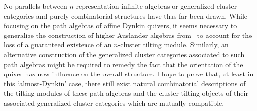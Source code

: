 \documentclass[a4paper,oneside,svgnames]{amsart}
\theoremstyle{plain}
\theoremstyle{definition}
\begin{document}
 No parallels between $n$-representation-infinite algebras or generalized
 cluster categories and purely combinatorial structures have thus far been
 drawn. While focusing on the path algebras of affine Dynkin quivers, it seems
 necessary to generalize the construction of higher Auslander algebras
 from~\cite{iya} to account for the loss of a guaranteed existence of an
 $n$-cluster tilting module. Similarly, an alternative construction of the
 generalized cluster categories associated to such path algebras might be
 required to remedy the fact that the orientation of the quiver has now
 influence on the overall structure. I hope to prove that, at least in this
 `almost-Dynkin' case, there still exist natural combinatorial descriptions of
 the tilting modules of these path algebras and the cluster tilting objects of
 their associated generalized cluster categories which are mutually compatible.

 \printbibliography
\end{document}
